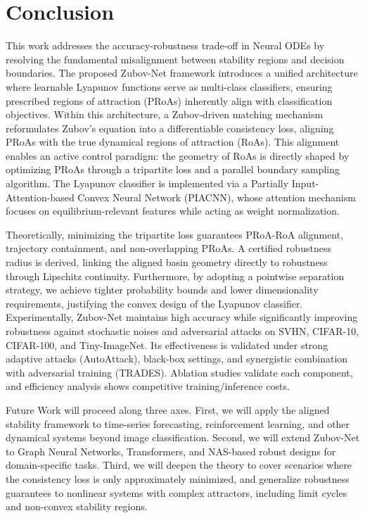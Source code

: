 \documentclass[journal]{IEEEtran}
\begin{document}
\section{Conclusion}
This work addresses the accuracy-robustness trade-off in Neural ODEs by resolving the fundamental misalignment between stability regions and decision boundaries. The proposed Zubov-Net framework introduces a unified architecture where learnable Lyapunov functions serve as multi-class classifiers, ensuring prescribed regions of attraction (PRoAs) inherently align with classification objectives. Within this architecture, a Zubov-driven matching mechanism reformulates Zubov’s equation into a differentiable consistency loss, aligning PRoAs with the true dynamical regions of attraction (RoAs). This alignment enables an active control paradigm: the geometry of RoAs is directly shaped by optimizing PRoAs through a tripartite loss and a parallel boundary sampling algorithm. The Lyapunov classifier is implemented via a Partially Input-Attention-based Convex Neural Network (PIACNN), whose attention mechanism focuses on equilibrium-relevant features while acting as weight normalization.

Theoretically, minimizing the tripartite loss guarantees PRoA-RoA alignment, trajectory containment, and non-overlapping PRoAs. A certified robustness radius is derived, linking the aligned basin geometry directly to robustness through Lipschitz continuity. Furthermore, by adopting a pointwise separation strategy, we achieve tighter probability bounds and lower dimensionality requirements, justifying the convex design of the Lyapunov classifier. Experimentally, Zubov-Net maintains high accuracy while significantly improving robustness against stochastic noises and adversarial attacks on SVHN, CIFAR-10, CIFAR-100, and Tiny-ImageNet. Its effectiveness is validated under strong adaptive attacks (AutoAttack), black-box settings, and synergistic combination with adversarial training (TRADES). Ablation studies validate each component, and efficiency analysis shows competitive training/inference costs.

Future Work will proceed along three axes. First, we will apply the aligned stability framework to time-series forecasting, reinforcement learning, and other dynamical systems beyond image classification. Second, we will extend Zubov-Net to Graph Neural Networks, Transformers, and NAS-based robust designs for domain-specific tasks. Third, we will deepen the theory to cover scenarios where the consistency loss is only approximately minimized, and generalize robustness guarantees to nonlinear systems with complex attractors, including limit cycles and non-convex stability regions.
\end{document}
